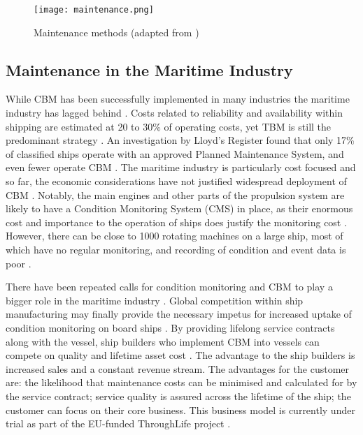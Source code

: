 \begin{figure}
    \centering
    \texttt{[image: maintenance.png]}
    \caption{Maintenance methods (adapted from \cite{CM_practical_wind_turbine})}
    \label{fig:strategies}
\end{figure}

\subsection{Maintenance in the Maritime Industry}

While CBM has been successfully implemented in many industries the maritime industry has lagged behind \cite{CBM_maritime_ann}.
Costs related to reliability and availability within shipping are estimated at 20 to 30\% of operating costs, yet TBM is still the predominant strategy \cite{CBM_maritime_ann}\cite{Maritime_stopford}.
An investigation by Lloyd's Register found that only 17\% of classified ships operate with an approved Planned Maintenance System, and even fewer operate CBM \cite{CBM_danny}.
The maritime industry is particularly cost focused and so far, the economic considerations have not justified widespread deployment of CBM \cite{CBM_beyond_maritime}\cite{CBM_maritime_ann}.
Notably, the main engines and other parts of the propulsion system are likely to have a Condition Monitoring System (CMS) in place, as their enormous cost and importance to the operation of ships does justify the monitoring cost \cite{CBM_beyond_maritime}.
However, there can be close to 1000 rotating machines on a large ship, most of which have no regular monitoring, and recording of condition and event data is poor \cite{CBM_shipping_opportunity}.
\par

There have been repeated calls for condition monitoring and CBM to play a bigger role in the maritime industry \cite{CBM_shipping_opportunity}\cite{CBM_lr}.
Global competition within ship manufacturing may finally provide the necessary impetus for increased uptake of condition monitoring on board ships \cite{CBM_lifetime}.
By providing lifelong service contracts along with the vessel, ship builders who implement CBM into vessels can compete on quality and lifetime asset cost \cite{CBM_lifetime}.
The advantage to the ship builders is increased sales and a constant revenue stream.
The advantages for the customer are: the likelihood that maintenance costs can be minimised and calculated for by the service contract; service quality is assured across the lifetime of the ship; the customer can focus on their core business.
This business model is currently under trial as part of the EU-funded ThroughLife project \cite{CBM_lifetime}.
\par

